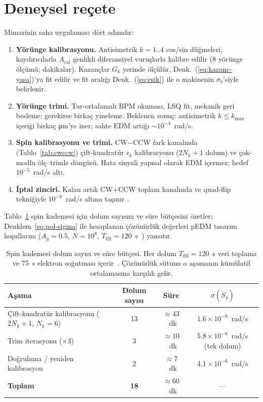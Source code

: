 \documentclass[preprint,12pt]{elsarticle}
\begin{document}
\section{Deneysel reçete}
\label{sec:recete}

Mimarinin saha uygulaması dört adımdır:

\begin{enumerate}
\item \textbf{Yörünge kalibrasyonu.} Antisimetrik $k=1..4$ cos/sin
düğmeleri, kaydırıcılarla $A_\mathrm{cal}$ genlikli diferansiyel
vuruşlarla kalibre edilir (8 yörünge ölçümü; dakikalar). Kazançlar
$G_k$ yerinde ölçülür, Denk.~(\ref{eq:kazanc-yasa})'ya fit edilir ve
fit aralığı Denk.~(\ref{eq:esik}) ile o makinenin $\sigma_b$'siyle
belirlenir.
\item \textbf{Yörünge trimi.} Tur-ortalamalı BPM okuması, LSQ fit,
mekanik geri besleme; gerekirse birkaç yineleme. Beklenen sonuç:
antisimetrik $k\le k_\mathrm{max}$ içeriği birkaç
\si{\micro\meter}'ye iner; sahte EDM artığı $\sim10^{-4}$~rad/s.
\item \textbf{Spin kalibrasyonu ve trimi.} CW$-$CCW fark kanalında
(Tablo~\ref{tab:cwccw}) çift-kuadratür $c_k$ kalibrasyonu ($2N_k+1$
dolum) ve çok-modlu ölç--trimle döngüsü. Hata sinyali yapısal olarak
EDM içermez; hedef $10^{-5}$~rad/s altı.
\item \textbf{İptal zinciri.} Kalan artık CW$+$CCW toplam kanalında
ve quad-flip tekniğiyle $10^{-9}$~rad/s altına
taşınır~\cite{todo-omarov}.
\end{enumerate}

Tablo~\ref{tab:sure-butcesi} spin kademesi için dolum sayısını ve süre
bütçesini özetler; Denklem~\ref{eq:pol-sigma} ile hesaplanan çözünürlük
değerleri pEDM tasarım koşullarını ($A_y=0.5$, $N=10^8$,
$T_\mathrm{fill}=120$~s~\cite{mueller2020}) yansıtır.

\begin{table}[htb]
\centering
\caption{Spin kademesi dolum sayısı ve süre bütçesi.
  Her dolum $T_\mathrm{fill}=120$~s veri toplama ve 75~s
  elektron soğutması içerir~\cite{mueller2020}.
  Çözünürlük sütunu o aşamanın kümülatif ortalamasına karşılık gelir.}
\label{tab:sure-butcesi}
\begin{tabular}{lccc}
\toprule
Aşama & Dolum sayısı & Süre & $\sigma(\dot{S}_y)$ \\
\midrule
Çift-kuadratür kalibrasyonu ($2N_k+1$, $N_k=6$) & 13 & $\approx43$~dk
  & $1.6\times10^{-6}$~rad/s \\
Trim iterasyonu ($\times3$) & 3 & $\approx10$~dk
  & $5.8\times10^{-6}$~rad/s (tek dolum) \\
Doğrulama / yeniden kalibrasyon & 2 & $\approx7$~dk
  & $4.1\times10^{-6}$~rad/s \\
\midrule
\textbf{Toplam} & \textbf{18} & $\approx60$~dk & --- \\
\bottomrule
\end{tabular}
\end{table}
\end{document}
